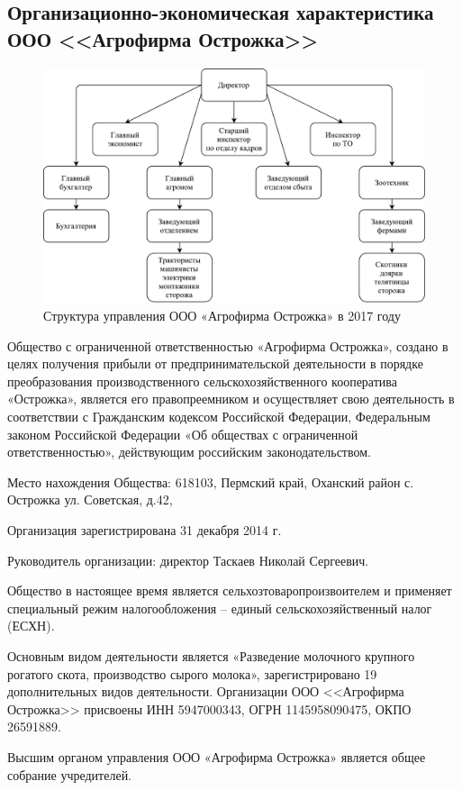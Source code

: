 \subsection{Организационно-экономическая характеристика ООО <<Агрофирма Острожка>>}

\begin{figure}[hb]
	\centering
	\includegraphics[width=0.8\linewidth]{fig2}
	\caption{Структура управления ООО «Агрофирма Острожка» в 2017 году}
	\label{fig:fig1}
\end{figure}

Общество с ограниченной ответственностью «Агрофирма Острожка», создано в целях получения прибыли от предпринимательской деятельности в порядке преобразования производственного сельскохозяйственного кооператива «Острожка», является его правопреемником и осуществляет свою деятельность в соответствии с Гражданским кодексом Российской Федерации, Федеральным законом Российской Федерации «Об обществах с ограниченной ответственностью», действующим российским законодательством.

Место нахождения Общества: 618103, Пермский край, Оханский район с. Острожка ул. Советская, д.42,

Организация зарегистрирована 31 декабря 2014 г.

Руководитель организации: директор Таскаев Николай Сергеевич.

Общество в настоящее время является сельхозтоваропроизвоителем и применяет специальный режим налогообложения – единый сельскохозяйственный налог (ЕСХН).

Основным видом деятельности является «Разведение молочного крупного рогатого скота, производство сырого молока», зарегистрировано 19 дополнительных видов деятельности. Организации ООО <<Агрофирма Острожка>> присвоены ИНН 5947000343, ОГРН 1145958090475, ОКПО 26591889.

Высшим органом управления ООО «Агрофирма Острожка» является общее собрание учредителей.


